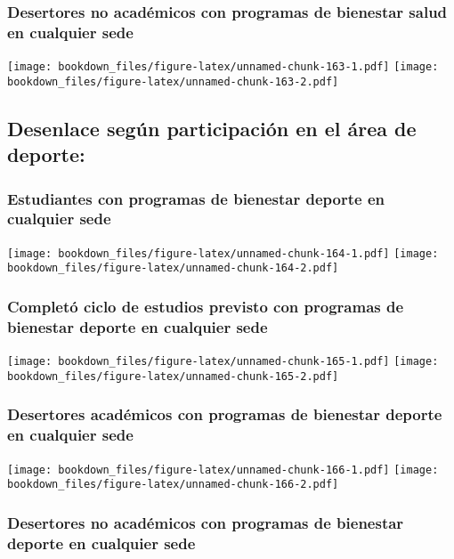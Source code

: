\documentclass[]{article}
\theoremstyle{definition}
\theoremstyle{definition}
\theoremstyle{definition}
\theoremstyle{remark}
\begin{document}
\subsubsection{Desertores no académicos con programas de bienestar salud
en cualquier
sede}\label{desertores-no-academicos-con-programas-de-bienestar-salud-en-cualquier-sede}

\texttt{[image: bookdown\_files/figure-latex/unnamed-chunk-163-1.pdf]}
\texttt{[image: bookdown\_files/figure-latex/unnamed-chunk-163-2.pdf]}

\subsection{Desenlace según participación en el área de
deporte:}\label{desenlace-segun-participacion-en-el-area-de-deporte}

\subsubsection{Estudiantes con programas de bienestar deporte en
cualquier
sede}\label{estudiantes-con-programas-de-bienestar-deporte-en-cualquier-sede}

\texttt{[image: bookdown\_files/figure-latex/unnamed-chunk-164-1.pdf]}
\texttt{[image: bookdown\_files/figure-latex/unnamed-chunk-164-2.pdf]}

\subsubsection{Completó ciclo de estudios previsto con programas de
bienestar deporte en cualquier
sede}\label{completo-ciclo-de-estudios-previsto-con-programas-de-bienestar-deporte-en-cualquier-sede}

\texttt{[image: bookdown\_files/figure-latex/unnamed-chunk-165-1.pdf]}
\texttt{[image: bookdown\_files/figure-latex/unnamed-chunk-165-2.pdf]}

\subsubsection{Desertores académicos con programas de bienestar deporte
en cualquier
sede}\label{desertores-academicos-con-programas-de-bienestar-deporte-en-cualquier-sede}

\texttt{[image: bookdown\_files/figure-latex/unnamed-chunk-166-1.pdf]}
\texttt{[image: bookdown\_files/figure-latex/unnamed-chunk-166-2.pdf]}

\subsubsection{Desertores no académicos con programas de bienestar
deporte en cualquier
sede}\label{desertores-no-academicos-con-programas-de-bienestar-deporte-en-cualquier-sede}
\end{document}
